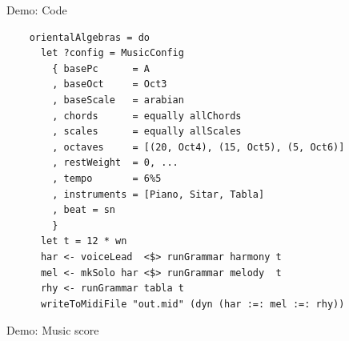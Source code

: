 \documentclass{beamer}
\begin{document}
	\begin{frame}[fragile=singleslide]{Demo: Code}
	\begin{verbatim}
    orientalAlgebras = do
      let ?config = MusicConfig
        { basePc      = A
        , baseOct     = Oct3
        , baseScale   = arabian
        , chords      = equally allChords
        , scales      = equally allScales
        , octaves     = [(20, Oct4), (15, Oct5), (5, Oct6)]
        , restWeight  = 0, ...
        , tempo       = 6%5
        , instruments = [Piano, Sitar, Tabla]
        , beat = sn
        }
      let t = 12 * wn
      har <- voiceLead  <$> runGrammar harmony t
      mel <- mkSolo har <$> runGrammar melody  t
      rhy <- runGrammar tabla t
      writeToMidiFile "out.mid" (dyn (har :=: mel :=: rhy))
	\end{verbatim}
  	\end{frame}

	\begin{frame}[c]{Demo: Music score}
	\centering
	\vspace{-1.2cm}
	\begin{center}
    \end{center}
	\end{frame}
  	
\end{document}
